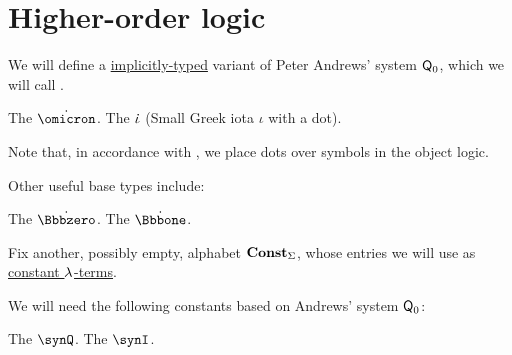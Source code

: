 \section{Higher-order logic}\label{sec:higher_order_logic}

\begin{definition}\label{def:weak_q0}
  We will define a \hyperref[con:implicit_typing]{implicitly-typed} variant of Peter Andrews' system \( \textsf{Q}_0 \), which we will call .

  \begin{thmenum}[series=def:simple_type_system/base]
     The  \( \synomicron \).
     The  \( \dot{\iota} \) (Small Greek iota \( \iota \) with a dot).
  \end{thmenum}

  Note that, in accordance with , we place dots over symbols in the object logic.

  Other useful base types include:
  \begin{thmenum}[resume=def:simple_type_system/base]
     The  \( \syn\Bbbzero \).
     The  \( \syn\Bbbone \).
  \end{thmenum}

   Fix another, possibly empty, alphabet \( \op*{Const}_\Sigma \), whose entries we will use as \hyperref[def:lambda_term/const]{constant \( \mathrm{\lambda} \)-terms}.

  We will need the following constants based on Andrews' system \( \textsf{Q}_0 \):
  \begin{thmenum}
     The  \( \synQ \).
     The  \( \synI \).
  \end{thmenum}
\end{definition}
